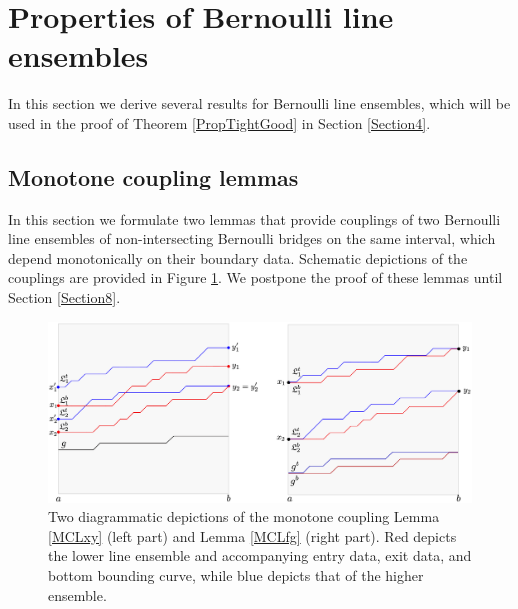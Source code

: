 %
\section{Properties of Bernoulli line ensembles}\label{Section3} In this section we derive several results for Bernoulli line ensembles, which will be used in the proof of Theorem \ref{PropTightGood} in Section \ref{Section4}.


%
\subsection{Monotone coupling lemmas}\label{Section3.1}
 In this section we formulate two lemmas that provide couplings of two Bernoulli line ensembles of non-intersecting Bernoulli bridges on the same interval, which depend monotonically on their boundary data. Schematic depictions of the couplings are provided in Figure \ref{fig:MCL}. We postpone the proof of these lemmas until Section \ref{Section8}. 
\begin{figure}[ht]
  \includegraphics[width=1.02\textwidth]{graphics/MonotoneCoupling.png}
  \caption{Two diagrammatic depictions of the monotone coupling Lemma \ref{MCLxy} (left part) and Lemma \ref{MCLfg} (right part). Red depicts the lower line ensemble and accompanying entry data, exit data, and bottom bounding curve, while blue depicts that of the higher ensemble.}
  \label{fig:MCL}
\end{figure}

